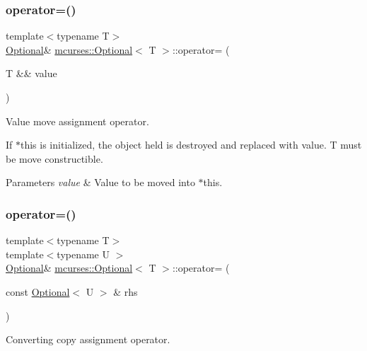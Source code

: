 \subsubsection{\texorpdfstring{operator=()}{operator=()}\hspace{0.1cm}{\footnotesize\ttfamily [5/7]}}
{\footnotesize\ttfamily template$<$typename T$>$ \\
\hyperlink{classmcurses_1_1Optional}{Optional}\& \hyperlink{classmcurses_1_1Optional}{mcurses\+::\+Optional}$<$ T $>$\+::operator= (\begin{DoxyParamCaption}\item[{T \&\&}]{value }\end{DoxyParamCaption})\hspace{0.3cm}{\ttfamily [inline]}}



Value move assignment operator. 

If $\ast$this is initialized, the object held is destroyed and replaced with {\ttfamily value}. T must be move constructible. 
\begin{DoxyParams}{Parameters}
{\em value} & Value to be moved into $\ast$this. \\
\hline
\end{DoxyParams}
\hypertarget{classmcurses_1_1Optional_a3cb153eb9365b4fc64616d7505465ed8}{}\label{classmcurses_1_1Optional_a3cb153eb9365b4fc64616d7505465ed8} 
\subsubsection{\texorpdfstring{operator=()}{operator=()}\hspace{0.1cm}{\footnotesize\ttfamily [6/7]}}
{\footnotesize\ttfamily template$<$typename T$>$ \\
template$<$typename U $>$ \\
\hyperlink{classmcurses_1_1Optional}{Optional}\& \hyperlink{classmcurses_1_1Optional}{mcurses\+::\+Optional}$<$ T $>$\+::operator= (\begin{DoxyParamCaption}\item[{const \hyperlink{classmcurses_1_1Optional}{Optional}$<$ U $>$ \&}]{rhs }\end{DoxyParamCaption})\hspace{0.3cm}{\ttfamily [inline]}}



Converting copy assignment operator. 

